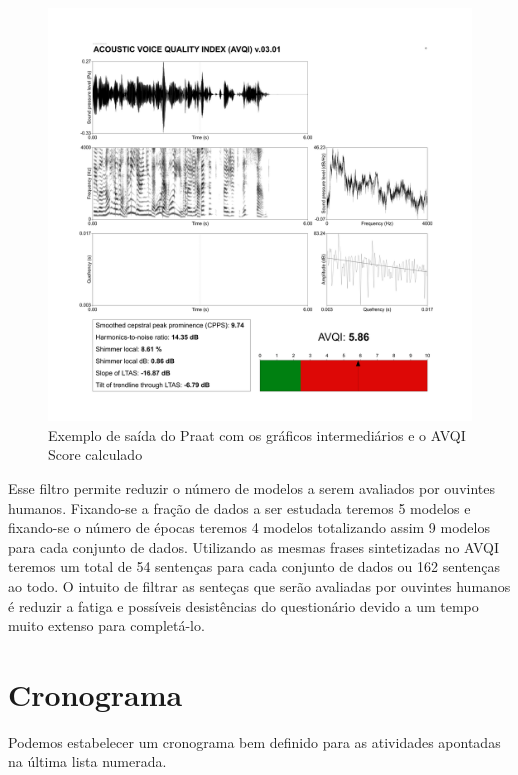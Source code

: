 \documentclass{article}
\begin{document}
\begin{figure}
	\centering
	\includegraphics[width=\textwidth]{figuras/praat_output_sample.png}
	\caption{Exemplo de saída do Praat com os gráficos intermediários e o AVQI Score calculado}
	\label{fig:praat}
\end{figure}

Esse filtro permite reduzir o número de modelos a serem avaliados por ouvintes humanos.
Fixando-se a fração de dados a ser estudada teremos 5 modelos e fixando-se o número de épocas teremos 4 modelos totalizando assim 9 modelos para cada conjunto de dados.
Utilizando as mesmas frases sintetizadas no AVQI teremos um total de 54 sentenças para cada conjunto de dados ou 162 sentenças ao todo.
O intuito de filtrar as senteças que serão avaliadas por ouvintes humanos é reduzir a fatiga e possíveis desistências do questionário devido a um tempo muito extenso para completá-lo.

\section{Cronograma}

Podemos estabelecer um cronograma bem definido para as atividades apontadas na última lista numerada.

  
  
\end{document}

